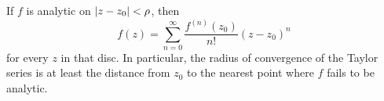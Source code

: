 \begin{theorem}\label{thm:taylor}
  If $f$ is analytic on $\lvert z - z_0\rvert < \rho$, then
  \[
    f(z) = \sum_{n=0}^{\infty} \frac{f^{(n)}(z_0)}{n!} (z - z_0)^n
  \]
  for every $z$ in that disc. In particular, the radius of convergence of the
  Taylor series is at least the distance from $z_0$ to the nearest point where
  $f$ fails to be analytic.
\end{theorem}

